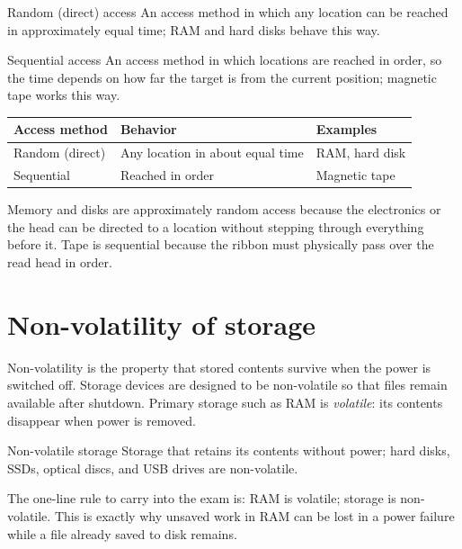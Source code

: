 \begin{definitionbox}{Random (direct) access}
An access method in which any location can be reached in approximately equal
time; RAM and hard disks behave this way.
\end{definitionbox}

\begin{definitionbox}{Sequential access}
An access method in which locations are reached in order, so the time depends
on how far the target is from the current position; magnetic tape works this
way.
\end{definitionbox}

\begin{center}
\begin{tabular}{p{}p{}p{}}
\toprule
\textbf{Access method} & \textbf{Behavior} & \textbf{Examples}\\
\midrule
Random (direct) & Any location in about equal time & RAM, hard disk\\
Sequential & Reached in order & Magnetic tape\\
\bottomrule
\end{tabular}
\end{center}

Memory and disks are approximately random access because the electronics or
the head can be directed to a location without stepping through everything
before it. Tape is sequential because the ribbon must physically pass over the
read head in order.

\section{Non-volatility of storage}
Non-volatility is the property that stored contents survive when the power is
switched off. Storage devices are designed to be non-volatile so that files
remain available after shutdown. Primary storage such as RAM is
\emph{volatile}: its contents disappear when power is removed.

\begin{definitionbox}{Non-volatile storage}
Storage that retains its contents without power; hard disks, SSDs, optical
discs, and USB drives are non-volatile.
\end{definitionbox}

The one-line rule to carry into the exam is: RAM is volatile; storage is
non-volatile. This is exactly why unsaved work in RAM can be lost in a power
failure while a file already saved to disk remains.

